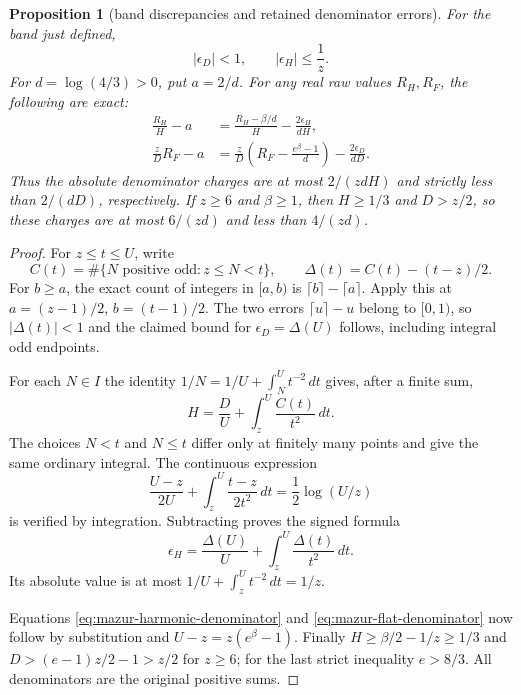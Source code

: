 \documentclass[11pt]{article}
\newtheorem{proposition}{Proposition}
\theoremstyle{remark}\newtheorem{remark}[proposition]{Remark}
\begin{document}
\begin{proposition}[band discrepancies and retained denominator errors]
\label{prop:mazur-band-denominators}
For the band just defined,
\begin{equation}
 |\epsilon_D|<1,\qquad |\epsilon_H|\le\frac1z.
 \label{eq:mazur-band-denominators}
\end{equation}
For $d=\log(4/3)>0$, put $a=2/d$.
For any real raw values $R_H,R_F$, the following are exact:
\begin{align}
 \frac{R_H}{H}-a
 &=\frac{R_H-\beta/d}{H}-\frac{2\epsilon_H}{dH},
 \label{eq:mazur-harmonic-denominator}\\
 \frac zD R_F-a
 &=\frac zD\left(R_F-\frac{e^\beta-1}{d}\right)
       -\frac{2\epsilon_D}{dD}.
 \label{eq:mazur-flat-denominator}
\end{align}
Thus the absolute denominator charges are at most
$2/(zdH)$ and strictly less than $2/(dD)$, respectively.
If $z\ge6$ and $\beta\ge1$, then $H\ge1/3$ and $D>z/2$,
so these charges are at most $6/(zd)$ and less than $4/(zd)$.
\end{proposition}
\begin{proof}
For $z\le t\le U$, write
\[
 C(t)=\#\{N\text{ positive odd}:z\le N<t\},\qquad
 \Delta(t)=C(t)-(t-z)/2 .
\]
For $b\ge a$, the exact count of integers in $[a,b)$ is
$\lceil b\rceil-\lceil a\rceil$.
Apply this at $a=(z-1)/2$, $b=(t-1)/2$.
The two errors $\lceil u\rceil-u$ belong to $[0,1)$,
so $|\Delta(t)|<1$ and the claimed bound for $\epsilon_D=\Delta(U)$
follows, including integral odd endpoints.

For each $N\in I$ the identity
$1/N=1/U+\int_N^U t^{-2}\,dt$ gives, after a finite sum,
\[
 H=\frac D U+\int_z^U\frac{C(t)}{t^2}\,dt.
\]
The choices $N<t$ and $N\le t$ differ only at finitely many points
and give the same ordinary integral. The continuous expression
\[
 \frac{U-z}{2U}+
 \int_z^U\frac{t-z}{2t^2}\,dt=\frac12\log(U/z)
\]
is verified by integration. Subtracting proves the signed formula
\[
 \epsilon_H=\frac{\Delta(U)}U+
                      \int_z^U\frac{\Delta(t)}{t^2}\,dt .
\]
Its absolute value is at most
$1/U+\int_z^Ut^{-2}\,dt=1/z$.

Equations \eqref{eq:mazur-harmonic-denominator} and
\eqref{eq:mazur-flat-denominator} now follow by substitution and
$U-z=z(e^\beta-1)$. Finally
$H\ge\beta/2-1/z\ge1/3$ and
$D>(e-1)z/2-1>z/2$ for $z\ge6$; for the last strict inequality
$e>8/3$. All denominators are the original positive sums.
\end{proof}
\end{document}
